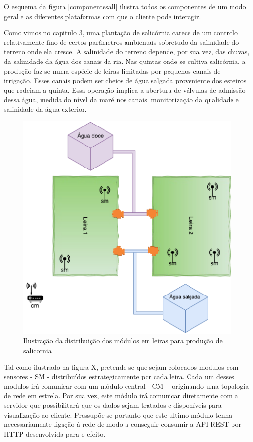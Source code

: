 O esquema da figura \ref{componentesall} ilustra todos os componentes de um modo geral e as diferentes plataformas com que o cliente pode interagir. 


Como vimos no capitulo 3, uma plantação de  salicórnia carece de um controlo relativamente fino de certos parâmetros ambientais sobretudo da salinidade do terreno onde ela cresce. A salinidade do terreno depende, por sua vez, das chuvas, da salinidade da água dos canais da ria. Nas quintas onde se cultiva salicórnia, a produção faz-se numa espécie de leiras limitadas por pequenos canais de irrigação. Esses canais podem ser cheios de água salgada proveniente dos esteiros que rodeiam a quinta. Essa operação implica a abertura de válvulas de admissão dessa água, medida do nível da maré nos canais, monitorização da qualidade e salinidade da água exterior.



\begin{figure}[!htb]
	\centering
	\includegraphics[scale=0.55]{esquemas/leiras-comm-geral.pdf}
	\caption{Ilustração da distribuição dos módulos em leiras para produção de salicornia }
	\label{leira}
\end{figure}


Tal como ilustrado na figura X, pretende-se que sejam colocados modulos com sensores - \ac{SM} - distribuídos estrategicamente por cada leira. Cada um desses modulos irá comunicar com um módulo central - \ac{CM} -, originando uma topologia de rede em estrela.  Por sua vez, este módulo irá comunicar diretamente com a servidor que possibilitará que os dados sejam tratados e disponíveis para visualização ao cliente. Pressupõe-se portanto que este ultimo módulo tenha necessariamente ligação à rede de modo a conseguir consumir a API REST por HTTP desenvolvida para o efeito. 



